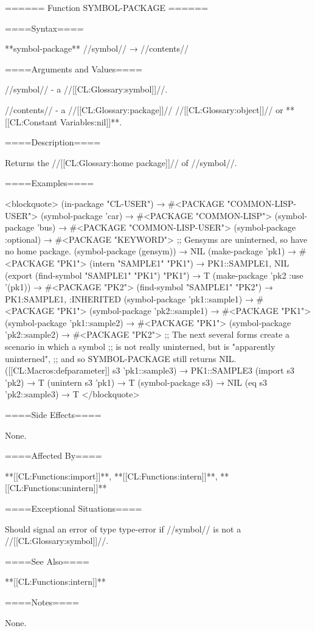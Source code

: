 ====== Function SYMBOL-PACKAGE ======

====Syntax====

**symbol-package** //symbol// → //contents//

====Arguments and Values====

//symbol// - a //[[CL:Glossary:symbol]]//.

//contents// - a //[[CL:Glossary:package]]// //[[CL:Glossary:object]]// or **[[CL:Constant Variables:nil]]**.

====Description====

Returns the //[[CL:Glossary:home package]]// of //symbol//.

====Examples====

<blockquote> (in-package "CL-USER") → #<PACKAGE "COMMON-LISP-USER"> (symbol-package 'car) → #<PACKAGE "COMMON-LISP"> (symbol-package 'bus) → #<PACKAGE "COMMON-LISP-USER"> (symbol-package :optional) → #<PACKAGE "KEYWORD"> ;; Gensyms are uninterned, so have no home package. (symbol-package (gensym)) → NIL (make-package 'pk1) → #<PACKAGE "PK1"> (intern "SAMPLE1" "PK1") → PK1::SAMPLE1, NIL (export (find-symbol "SAMPLE1" "PK1") "PK1") → T (make-package 'pk2 :use '(pk1)) → #<PACKAGE "PK2"> (find-symbol "SAMPLE1" "PK2") → PK1:SAMPLE1, :INHERITED (symbol-package 'pk1::sample1) → #<PACKAGE "PK1"> (symbol-package 'pk2::sample1) → #<PACKAGE "PK1"> (symbol-package 'pk1::sample2) → #<PACKAGE "PK1"> (symbol-package 'pk2::sample2) → #<PACKAGE "PK2"> ;; The next several forms create a scenario in which a symbol ;; is not really uninterned, but is "apparently uninterned", ;; and so SYMBOL-PACKAGE still returns NIL. ([[CL:Macros:defparameter]] s3 'pk1::sample3) → PK1::SAMPLE3 (import s3 'pk2) → T (unintern s3 'pk1) → T (symbol-package s3) → NIL (eq s3 'pk2::sample3) → T </blockquote>

====Side Effects====

None.

====Affected By====

**[[CL:Functions:import]]**, **[[CL:Functions:intern]]**, **[[CL:Functions:unintern]]**

====Exceptional Situations====

Should signal an error of type type-error if //symbol// is not a //[[CL:Glossary:symbol]]//.

====See Also====

**[[CL:Functions:intern]]**

====Notes====

None.

